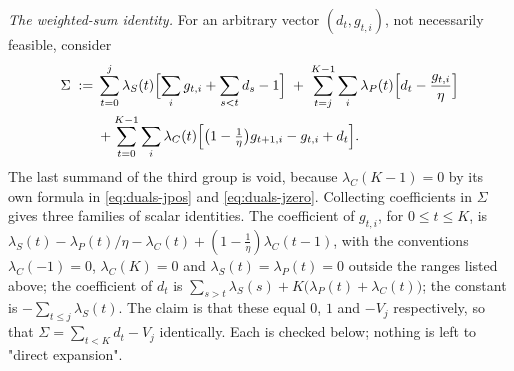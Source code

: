 \emph{The weighted-sum identity.}  For an arbitrary vector $(d_t,g_{t,i})$,
not necessarily feasible, consider
\begin{equation}\label{eq:combination}
\begin{aligned}
  \Sigma\;:=\;&\sum_{t=0}^{j}\lambda_S(t)
      \Bigl[\sum_ig_{t,i}+\sum_{s<t}d_s-1\Bigr]
   \;+\;\sum_{t=j}^{K-1}\sum_i\lambda_P(t)
      \Bigl[d_t-\frac{g_{t,i}}{\eta}\Bigr]\\
  &+\sum_{t=0}^{K-1}\sum_i\lambda_C(t)
     \Bigl[\bigl(1-\tfrac1\eta\bigr)g_{t+1,i}-g_{t,i}+d_t\Bigr].
\end{aligned}
\end{equation}
The last summand of the third group is void, because $\lambda_C(K-1)=0$ by its
own formula in \eqref{eq:duals-jpos} and \eqref{eq:duals-jzero}.
Collecting coefficients in $\Sigma$ gives three families of scalar identities.
The coefficient of $g_{t,i}$, for $0\le t\le K$, is
$\lambda_S(t)-\lambda_P(t)/\eta-\lambda_C(t)+(1-\tfrac1\eta)\lambda_C(t-1)$,
with the conventions $\lambda_C(-1)=0$, $\lambda_C(K)=0$ and
$\lambda_S(t)=\lambda_P(t)=0$ outside the ranges listed above; the coefficient
of $d_t$ is $\sum_{s>t}\lambda_S(s)+K\bigl(\lambda_P(t)+\lambda_C(t)\bigr)$;
the constant is $-\sum_{t\le j}\lambda_S(t)$.  The claim is that these equal
$0$, $1$ and $-V_j$ respectively, so that
$\Sigma=\sum_{t<K}d_t-V_j$ identically.  Each is checked below; nothing is
left to "direct expansion".

